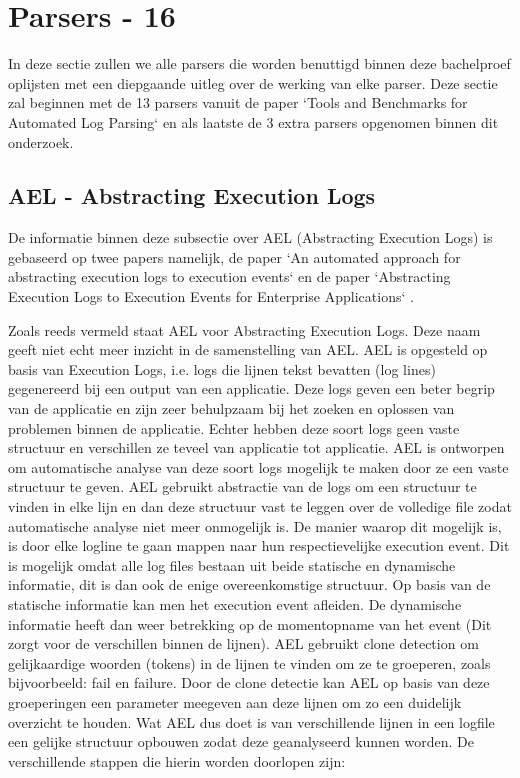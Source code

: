 \section{Parsers - 16}
In deze sectie zullen we alle parsers die worden benuttigd binnen deze bachelproef oplijsten met een diepgaande uitleg over de werking van elke parser. Deze sectie zal beginnen met de 13 parsers vanuit de paper `Tools and Benchmarks for Automated Log Parsing` \autocite{TBA2019} en als laatste de 3 extra parsers opgenomen binnen dit onderzoek.

\subsection{AEL -  Abstracting Execution Logs}
De informatie binnen deze subsectie over AEL (Abstracting Execution Logs) is gebaseerd op twee papers namelijk, de paper `An automated approach for abstracting execution logs to execution events` \autocite{jiang2008automated} en de paper `Abstracting Execution Logs to Execution Events for Enterprise Applications` \autocite{jiang2008abstracting}. 

Zoals reeds vermeld staat AEL voor Abstracting Execution Logs. Deze naam geeft niet echt meer inzicht in de samenstelling van AEL. AEL is opgesteld op basis van Execution Logs, i.e. logs die lijnen tekst bevatten (log lines) gegenereerd bij een output van een applicatie. Deze logs geven een beter begrip van de applicatie en zijn zeer behulpzaam bij het zoeken en oplossen van problemen binnen de applicatie. Echter hebben deze soort logs geen vaste structuur en verschillen ze teveel van applicatie tot applicatie. AEL is ontworpen om automatische analyse van deze soort logs mogelijk te maken door ze een vaste structuur te geven. AEL gebruikt abstractie van de logs om een structuur te vinden in elke lijn en dan deze structuur vast te leggen over de volledige file zodat automatische analyse niet meer onmogelijk is. De manier waarop dit mogelijk is, is door elke logline te gaan mappen naar hun respectievelijke execution event. Dit is mogelijk omdat alle log files bestaan uit beide statische en dynamische informatie, dit is dan ook de enige overeenkomstige structuur. Op basis van de statische informatie kan men het execution event afleiden. De dynamische informatie heeft dan weer betrekking op de momentopname van het event (Dit zorgt voor de verschillen binnen de lijnen). AEL gebruikt clone detection om gelijkaardige woorden (tokens) in de lijnen te vinden om ze te groeperen, zoals bijvoorbeeld: fail en failure. Door de clone detectie kan AEL op basis van deze groeperingen een parameter meegeven aan deze lijnen om zo een duidelijk overzicht te houden. Wat AEL dus doet is van verschillende lijnen in een logfile een gelijke structuur opbouwen zodat deze geanalyseerd kunnen worden. De verschillende stappen die hierin worden doorlopen zijn:

